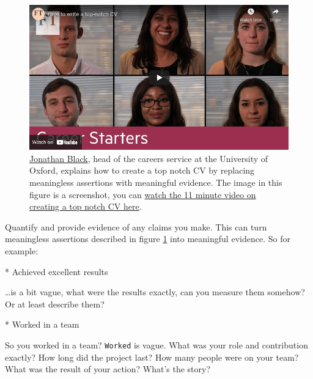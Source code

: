 \documentclass[
]{book}
\newenvironment{Shaded}{\begin{snugshade}}{\end{snugshade}}
\newcommand{\NormalTok}[1]{#1}
\newcommand{\SpecialStringTok}[1]{\textcolor[rgb]{0.31,0.60,0.02}{#1}}
\begin{document}
\begin{figure}

{\centering \includegraphics[width=0.99\linewidth]{images/youtube-jonathan-black} 

}

\caption{\href{https://twitter.com/jonathanpblack}{Jonathan Black}, head of the careers service at the University of Oxford, explains how to create a top notch CV by replacing meaningless assertions with meaningful evidence. \citep{topnotchcv} The image in this figure is a screenshot, you can \href{https://www.youtube.com/watch?v=yjdvCHWVtE4}{watch the 11 minute video on creating a top notch CV here}.}\label{fig:black-fig}
\end{figure}



Quantify and provide evidence of any claims you make. This can turn meaningless assertions described in figure \ref{fig:black-fig} into meaningful evidence. So for example:

\begin{Shaded}
\begin{Highlighting}[]
\SpecialStringTok{* }\NormalTok{Achieved excellent results}
\end{Highlighting}
\end{Shaded}

\ldots is a bit vague, what were the results exactly, can you measure them somehow? Or at least describe them?

\begin{Shaded}
\begin{Highlighting}[]
\SpecialStringTok{* }\NormalTok{Worked in a team}
\end{Highlighting}
\end{Shaded}

So you worked in a team? \texttt{Worked} is vague. What was your role and contribution exactly? How long did the project last? How many people were on your team? What was the result of your action? What's the story?
\end{document}
